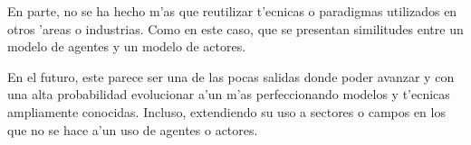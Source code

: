 \documentclass[12pt]{article}
\begin{document}
En parte, no se ha hecho m'as que reutilizar t'ecnicas o paradigmas utilizados en otros 'areas o industrias. Como en este caso,
que se presentan similitudes entre un modelo de agentes y un modelo de actores.

En el futuro, este parece ser una de las pocas salidas donde poder avanzar y con una alta probabilidad evolucionar a'un m'as
perfeccionando modelos y t'ecnicas ampliamente conocidas. Incluso, extendiendo su uso a sectores o campos en los que no se hace
a'un uso de agentes o actores.

\printbibliography
\end{document}
